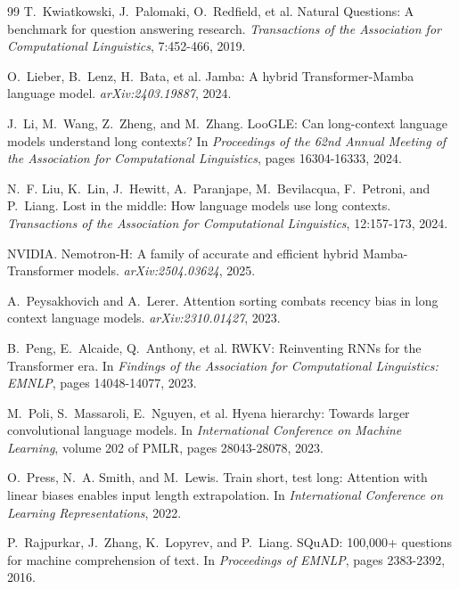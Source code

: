 \documentclass{article}
\begin{document}
{\begin{thebibliography}{99}
T.~Kwiatkowski, J.~Palomaki, O.~Redfield, et al.
\newblock Natural Questions: A benchmark for question answering research.
\newblock \emph{Transactions of the Association for Computational Linguistics}, 7:452-466, 2019.

O.~Lieber, B.~Lenz, H.~Bata, et al.
\newblock Jamba: A hybrid Transformer-Mamba language model.
\newblock \emph{arXiv:2403.19887}, 2024.

J.~Li, M.~Wang, Z.~Zheng, and M.~Zhang.
\newblock LooGLE: Can long-context language models understand long contexts?
\newblock In \emph{Proceedings of the 62nd Annual Meeting of the Association for Computational Linguistics}, pages 16304-16333, 2024.

N.~F. Liu, K.~Lin, J.~Hewitt, A.~Paranjape, M.~Bevilacqua, F.~Petroni, and P.~Liang.
\newblock Lost in the middle: How language models use long contexts.
\newblock \emph{Transactions of the Association for Computational Linguistics}, 12:157-173, 2024.

NVIDIA.
\newblock Nemotron-H: A family of accurate and efficient hybrid Mamba-Transformer models.
\newblock \emph{arXiv:2504.03624}, 2025.

A.~Peysakhovich and A.~Lerer.
\newblock Attention sorting combats recency bias in long context language models.
\newblock \emph{arXiv:2310.01427}, 2023.

B.~Peng, E.~Alcaide, Q.~Anthony, et al.
\newblock RWKV: Reinventing RNNs for the Transformer era.
\newblock In \emph{Findings of the Association for Computational Linguistics: EMNLP}, pages 14048-14077, 2023.

M.~Poli, S.~Massaroli, E.~Nguyen, et al.
\newblock Hyena hierarchy: Towards larger convolutional language models.
\newblock In \emph{International Conference on Machine Learning}, volume 202 of PMLR, pages 28043-28078, 2023.

O.~Press, N.~A. Smith, and M.~Lewis.
\newblock Train short, test long: Attention with linear biases enables input length extrapolation.
\newblock In \emph{International Conference on Learning Representations}, 2022.

P.~Rajpurkar, J.~Zhang, K.~Lopyrev, and P.~Liang.
\newblock SQuAD: 100,000+ questions for machine comprehension of text.
\newblock In \emph{Proceedings of EMNLP}, pages 2383-2392, 2016.


\end{thebibliography}}
\end{document}
